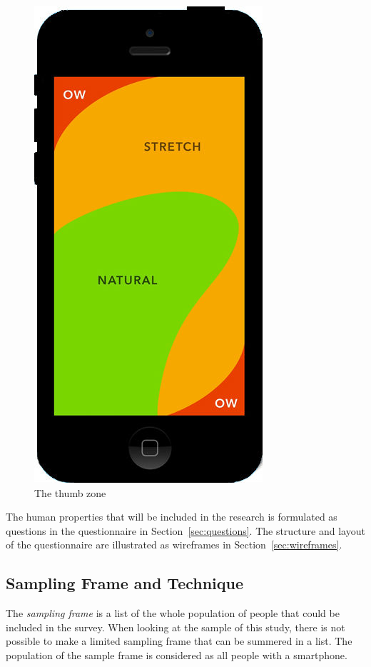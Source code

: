       \begin{figure}[H]
          \centering
          \includegraphics[scale=0.20]{pics/mobileScreen.jpg}
          \caption{The thumb zone}
          \label{fig:thumbZone}
        \end{figure}


    The human properties that will be included in the research is formulated as questions in the questionnaire in Section~\ref{sec:questions}. The structure and layout of the questionnaire are illustrated as wireframes in Section~\ref{sec:wireframes}.
    
    \subsection{Sampling Frame and Technique} \label{sec:sampling}
      
    The {\it sampling frame} is a list of the whole population of people that could be included in the survey. When looking at the sample of this study, there is not possible to make a limited sampling frame that can be summered in a list. The population of the sample frame is considered as all people with a smartphone.

